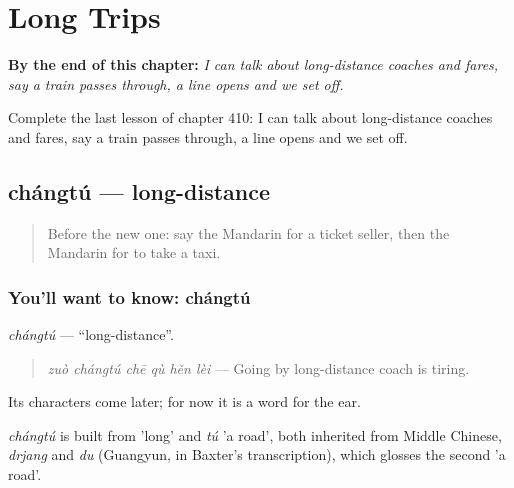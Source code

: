 
\chapter{Long Trips}
\label{ch:zh-long-trips}

\begin{chapteropening}
\textbf{By the end of this chapter:} \emph{I can talk about long-distance coaches and fares, say a train passes through, a line opens and we set off.}

Complete the last lesson of chapter 410: I can talk about long-distance coaches and fares, say a train passes through, a line opens and we set off.
\end{chapteropening}

\section[chángtú]{chángtú — long-distance}

\label{lesson:ZH-C410-changtu}



\begin{quote}
Before the new one: say the Mandarin for a ticket seller, then the Mandarin for to take a taxi.
\end{quote}

\subsection*{You'll want to know: chángtú}
\emph{chángtú} — \textquotedblleft{}long-distance\textquotedblright{}.

\begin{quote}
\emph{zuò chángtú chē qù hěn lèi} — Going by long-distance coach is tiring.
\end{quote}

Its characters come later; for now it is a word for the ear.

\begin{cousinweb}
\emph{chángtú} is built from  'long' and \emph{tú} 'a road', both inherited from Middle Chinese, \emph{drjang} and \emph{du} (Guangyun, in Baxter's transcription), which glosses the second 'a road'.
\end{cousinweb}

